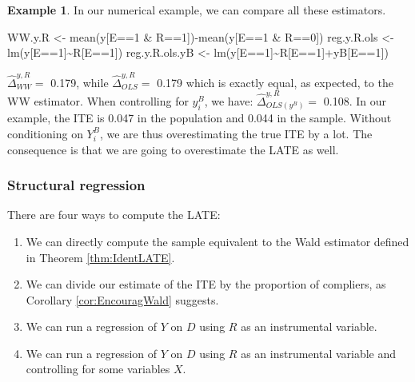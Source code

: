 \documentclass[
]{book}
\newenvironment{Shaded}{\begin{snugshade}}{\end{snugshade}}
\newcommand{\DecValTok}[1]{\textcolor[rgb]{0.00,0.00,0.81}{#1}}
\newcommand{\FunctionTok}[1]{\textcolor[rgb]{0.00,0.00,0.00}{#1}}
\newcommand{\NormalTok}[1]{#1}
\newcommand{\OtherTok}[1]{\textcolor[rgb]{0.56,0.35,0.01}{#1}}
\newcommand{\SpecialCharTok}[1]{\textcolor[rgb]{0.00,0.00,0.00}{#1}}
\providecommand{\tightlist}{%
  \setlength{\itemsep}{0pt}\setlength{\parskip}{0pt}}
\theoremstyle{definition}
\theoremstyle{definition}
\newtheorem{example}{Example}[chapter]
\theoremstyle{definition}
\theoremstyle{definition}
\theoremstyle{remark}
\begin{document}
\begin{example}
\protect\hypertarget{exm:unnamed-chunk-120}{}{\label{exm:unnamed-chunk-120} }In our numerical example, we can compare all these estimators.
\end{example}

\begin{Shaded}
\begin{Highlighting}[]
\NormalTok{WW.y.R }\OtherTok{\textless{}{-}} \FunctionTok{mean}\NormalTok{(y[E}\SpecialCharTok{==}\DecValTok{1} \SpecialCharTok{\&}\NormalTok{ R}\SpecialCharTok{==}\DecValTok{1}\NormalTok{])}\SpecialCharTok{{-}}\FunctionTok{mean}\NormalTok{(y[E}\SpecialCharTok{==}\DecValTok{1} \SpecialCharTok{\&}\NormalTok{ R}\SpecialCharTok{==}\DecValTok{0}\NormalTok{])}
\NormalTok{reg.y.R.ols }\OtherTok{\textless{}{-}} \FunctionTok{lm}\NormalTok{(y[E}\SpecialCharTok{==}\DecValTok{1}\NormalTok{]}\SpecialCharTok{\textasciitilde{}}\NormalTok{R[E}\SpecialCharTok{==}\DecValTok{1}\NormalTok{])}
\NormalTok{reg.y.R.ols.yB }\OtherTok{\textless{}{-}} \FunctionTok{lm}\NormalTok{(y[E}\SpecialCharTok{==}\DecValTok{1}\NormalTok{]}\SpecialCharTok{\textasciitilde{}}\NormalTok{R[E}\SpecialCharTok{==}\DecValTok{1}\NormalTok{]}\SpecialCharTok{+}\NormalTok{yB[E}\SpecialCharTok{==}\DecValTok{1}\NormalTok{])}
\end{Highlighting}
\end{Shaded}

\(\hat{\Delta}^{y,R}_{WW} =\) 0.179, while \(\hat{\Delta}^{y,R}_{OLS}=\) 0.179 which is exactly equal, as expected, to the WW estimator.
When controlling for \(y^B_i\), we have: \(\hat{\Delta}^{y,R}_{OLS(y^B)}=\) 0.108.
In our example, the ITE is 0.047 in the population and 0.044 in the sample.
Without conditioning on \(Y_i^B\), we are thus overestimating the true ITE by a lot.
The consequence is that we are going to overestimate the LATE as well.

\hypertarget{structural-regression}{%
\subsubsection{Structural regression}\label{structural-regression}}

There are four ways to compute the LATE:

\begin{enumerate}
\def\labelenumi{\arabic{enumi}.}
\tightlist
\item
  We can directly compute the sample equivalent to the Wald estimator defined in Theorem \ref{thm:IdentLATE}.
\item
  We can divide our estimate of the ITE by the proportion of compliers, as Corollary \ref{cor:EncouragWald} suggests.
\item
  We can run a regression of \(Y\) on \(D\) using \(R\) as an instrumental variable.
\item
  We can run a regression of \(Y\) on \(D\) using \(R\) as an instrumental variable and controlling for some variables \(X\).
\end{enumerate}
\end{document}
